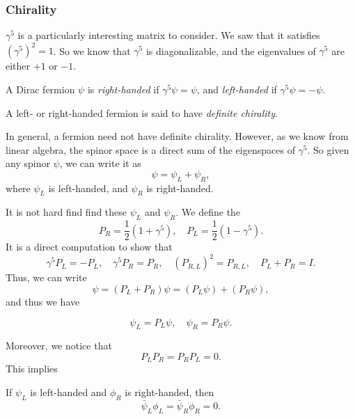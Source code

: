 \documentclass[a4paper]{article}
\begin{document}
\subsubsection*{Chirality}
$\gamma^5$ is a particularly interesting matrix to consider. We saw that it satisfies $(\gamma^5)^2 = 1$. So we know that $\gamma^5$ is diagonalizable, and the eigenvalues of $\gamma^5$ are either $+1$ or $-1$.
\begin{defi}[Chirality]
  A Dirac fermion $\psi$ is \emph{right-handed} if $\gamma^5 \psi = \psi$, and \emph{left-handed} if $\gamma^5 \psi =- \psi$.

  A left- or right-handed fermion is said to have \emph{definite chirality}.
\end{defi}
In general, a fermion need not have definite chirality. However, as we know from linear algebra, the spinor space is a direct sum of the eigenspaces of $\gamma^5$. So given any spinor $\psi$, we can write it as
\[
  \psi = \psi_L + \psi_R,
\]
where $\psi_L$ is left-handed, and $\psi_R$ is right-handed.

It is not hard find find these $\psi_L$ and $\psi_R$. We define the 
\[
  P_R = \frac{1}{2} (1 + \gamma^5),\quad P_L = \frac{1}{2} (1 - \gamma^5).
\]
It is a direct computation to show that
\[
  \gamma^5 P_L = - P_L,\quad \gamma^5 P_R = P_R,\quad (P_{R, L})^2 = P_{R, L},\quad P_L + P_R = I.
\]
Thus, we can write
\[
  \psi = (P_L + P_R) \psi = (P_L \psi) + (P_R \psi),
\]
and thus we have
\begin{notation}
  \[
    \psi_L = P_L \psi,\quad \psi_R = P_R \psi.
  \]
\end{notation}
Moreover, we notice that
\[
  P_L P_R = P_R P_L = 0.
\]
This implies
\begin{lemma}
  If $\psi_L$ is left-handed and $\phi_R$ is right-handed, then
  \[
    \bar\psi_L \phi_L = \bar\psi_R \phi_R = 0.
  \]
\end{lemma}
\end{document}
